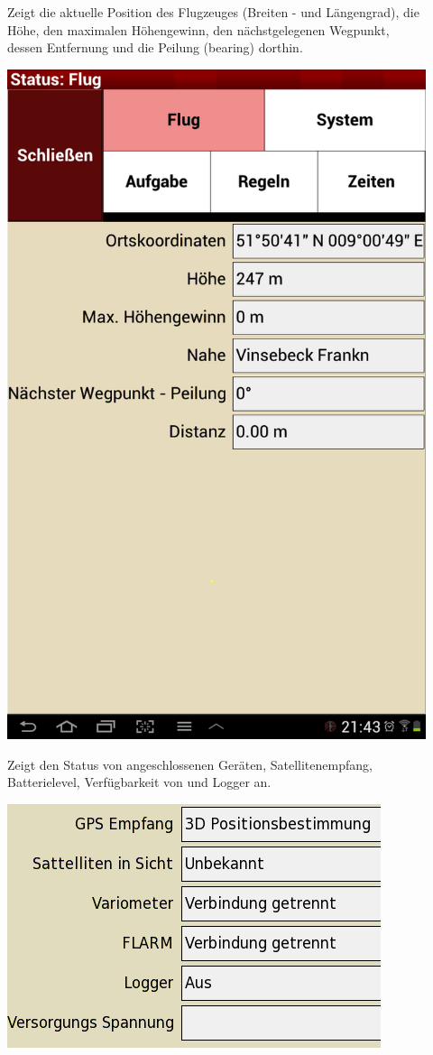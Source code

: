 \begin{description}
\item[] Zeigt die aktuelle Position des Flugzeuges (Breiten - und Längengrad), die Höhe, den maximalen Höhengewinn, den nächstgelegenen Wegpunkt, dessen Entfernung  und die Peilung (bearing) dorthin.
\begin{center}

\includegraphics[angle=0,width=0.5\linewidth,keepaspectratio='true']{figures/status-flight.png}
\end{center}

\item[] Zeigt den Status von angeschlossenen Geräten, Satellitenempfang,  Batterielevel, Verfügbarkeit von \fl und  Logger an. 

\begin{center}
\includegraphics[angle=0,width=0.5\linewidth,keepaspectratio='true']{figures/status-system.png}
\end{center}


\end{description}
